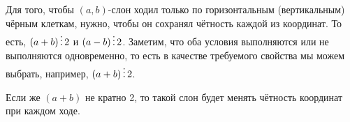 \begin{enumerate}
Для того, чтобы $(a,b)$-слон ходил только по горизонтальным (вертикальным)
чёрным клеткам, нужно, чтобы он сохранял чётность каждой из координат.
То есть, $(a+b) \mathop{\vdots} 2$ и $(a-b) \mathop{\vdots} 2$. Заметим, что оба условия
выполняются или не выполняются одновременно, то есть в качестве требуемого
свойства мы можем выбрать, например, $(a+b) \mathop{\vdots} 2$.

Если же $(a+b)$ не кратно 2, то такой слон будет менять чётность координат
при каждом ходе.



\end{enumerate}